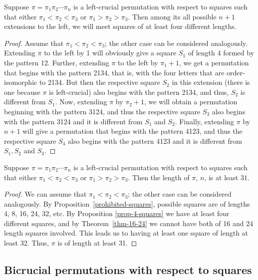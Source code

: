 \documentclass[12pt,reqno]{article}
\begin{document}
\begin{proposition}\label{prop-4-squares} Suppose $\pi=\pi_1\pi_2\cdots\pi_n$ is a left-crucial permutation with respect to squares such that either $\pi_1<\pi_2<\pi_3$ or $\pi_1>\pi_2>\pi_3$. Then among its all possible $n+1$ extensions to the left, we will meet squares of at least four different lengths. \end{proposition}

\begin{proof} Assume that $\pi_1<\pi_2<\pi_3$; the other case can be considered analogously. Extending $\pi$ to the left by 1 will obviously give a square $S_1$ of length 4 formed by the pattern 12. Further, extending $\pi$ to the left by $\pi_1+1$, we get a permutation that begins with the pattern 2134, that is, with the four letters that are order-isomorphic to 2134. But then the respective square $S_2$ in this extension (there is one because $\pi$ is left-crucial) also begins with the pattern 2134, and thus, $S_2$ is different from $S_1$. Now, extending $\pi$ by $\pi_2+1$, we will obtain a permutation beginning with the pattern 3124, and thus the respective square $S_3$ also begins with the pattern 3124 and it is different from $S_1$ and $S_2$. Finally, extending $\pi$ by $n+1$ will give a permutation that begins with the pattern 4123, and thus the respective square $S_4$ also begins with the pattern 4123 and it is different from $S_1,S_2$ and $S_3$.\end{proof}

\begin{theorem}\label{thm-length-31} Suppose $\pi=\pi_1\pi_2\cdots\pi_n$ is a left-crucial permutation with respect to squares such that either $\pi_1<\pi_2<\pi_3$ or $\pi_1>\pi_2>\pi_3$. Then the length of $\pi$, $n$, is at least $31$. \end{theorem}

\begin{proof} We can assume that $\pi_1<\pi_2<\pi_3$; the other case can be considered analogously. By Proposition~\ref{prohibited-squares}, possible squares are of lengths 4, 8, 16, 24, 32, etc. By Proposition \ref{prop-4-squares} we have at least four different squares, and by Theorem~\ref{thm-16-24} we cannot have both of 16 and 24 length squares involved. This leads us to having at least one square of length at least 32. Thus, $\pi$ is of length at least 31.\end{proof}



\subsection{Bicrucial permutations with respect to squares}\label{sub-bicrucial}
\end{document}
